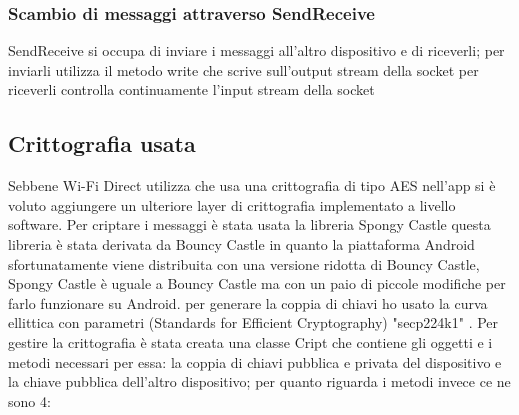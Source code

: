 \subsubsection{Scambio di messaggi attraverso SendReceive}
SendReceive si occupa di inviare i messaggi all'altro dispositivo
e di riceverli;
per inviarli utilizza il metodo write che scrive
sull'output stream della socket
per riceverli controlla continuamente l'input stream
della socket


\subsection{Crittografia usata}
Sebbene Wi-Fi Direct utilizza  che usa una crittografia di tipo
AES \cite{Wi-FiProtected}
nell'app si è voluto aggiungere un ulteriore layer di crittografia
implementato a livello software.
Per criptare i messaggi è stata usata la libreria
Spongy Castle \cite{Spongy} questa libreria è stata derivata
da Bouncy Castle in quanto 
la piattaforma Android sfortunatamente viene
distribuita con una versione ridotta di Bouncy Castle,
Spongy Castle è uguale a Bouncy Castle
ma con un paio di piccole modifiche per farlo funzionare su Android.
per generare la coppia di chiavi ho usato la curva ellittica con parametri
(Standards for Efficient Cryptography)
"secp224k1" \cite{sec}.
Per gestire la crittografia è stata creata una classe Cript che contiene
gli oggetti e i metodi necessari per essa: la coppia di chiavi pubblica e privata
del dispositivo e la chiave pubblica dell'altro dispositivo; per quanto riguarda i metodi
invece ce ne sono 4:
